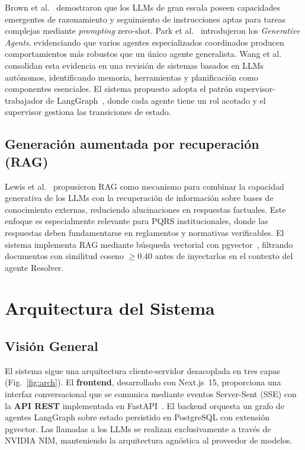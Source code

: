\documentclass[runningheads]{llncs}
\begin{document}
Brown et al.~\cite{brown2020} demostraron que los LLMs de gran escala poseen capacidades emergentes de razonamiento y seguimiento de instrucciones aptas para tareas complejas mediante \textit{prompting} zero-shot. Park et al.~\cite{park2023} introdujeron los \textit{Generative Agents}, evidenciando que varios agentes especializados coordinados producen comportamientos más robustos que un único agente generalista. Wang et al.~\cite{wang2024} consolidan esta evidencia en una revisión de sistemas basados en LLMs autónomos, identificando memoria, herramientas y planificación como componentes esenciales. El sistema propuesto adopta el patrón supervisor-trabajador de LangGraph~\cite{langgraph}, donde cada agente tiene un rol acotado y el supervisor gestiona las transiciones de estado.

\subsection{Generación aumentada por recuperación (RAG)}

Lewis et al.~\cite{rag} propusieron RAG como mecanismo para combinar la capacidad generativa de los LLMs con la recuperación de información sobre bases de conocimiento externas, reduciendo alucinaciones en respuestas factuales. Este enfoque es especialmente relevante para PQRS institucionales, donde las respuestas deben fundamentarse en reglamentos y normativas verificables. El sistema implementa RAG mediante búsqueda vectorial con pgvector~\cite{pgvector}, filtrando documentos con similitud coseno $\geq 0.40$ antes de inyectarlos en el contexto del agente Resolver.

\section{Arquitectura del Sistema}
\label{sec:arch}

\subsection{Visión General}

El sistema sigue una arquitectura cliente-servidor desacoplada en tres capas (Fig.~\ref{fig:arch}). El \textbf{frontend}, desarrollado con Next.js~15, proporciona una interfaz conversacional que se comunica mediante eventos Server-Sent (SSE) con la \textbf{API REST} implementada en FastAPI~\cite{fastapi}. El backend orquesta un grafo de agentes LangGraph sobre estado persistido en PostgreSQL con extensión pgvector. Las llamadas a los LLMs se realizan exclusivamente a través de NVIDIA NIM, manteniendo la arquitectura agnóstica al proveedor de modelos.
\end{document}
